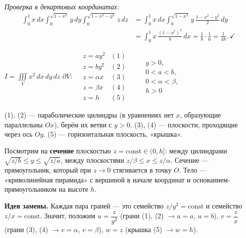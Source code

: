 \emph{Проверка в декартовых координатах:}
\[
\begin{aligned}\int_0^1x\,dx\int_0^{\sqrt{1-x^2}}y\,dy\int_0^{\sqrt{1-x^2-y^2}}z\,dz&=\int_0^1x\,dx\int_0^{\sqrt{1-x^2}}y\,\frac{1-x^2-y^2}{2}\,dy\\
&=\int_0^1x\,\frac{(1-x^2)^2}{8}\,dx=\frac18\cdot\frac16=\frac1{48}.\ \checkmark\end{aligned}
\]


\begin{shapka}
$\displaystyle I=\iiint\limits_{V}x^2\,dx\,dy\,dz$
\tcblower
$\partial V:\quad
\begin{array}{ll}
z=ay^2 & (1)\\
z=by^2 & (2)\\
z=\alpha x & (3)\\
z=\beta x & (4)\\
z=h & (5)
\end{array}\qquad
\begin{array}{l}y>0,\\ 0<a<b,\\ 0<\alpha<\beta,\\ h>0\end{array}$
\end{shapka}

(1), (2) --- параболические цилиндры (в уравнениях нет $x$, образующие параллельны $Ox$), берём их ветви с $y>0$. (3), (4) --- плоскости, проходящие через ось $Oy$. (5) --- горизонтальная плоскость, «крышка».

Посмотрим на \textbf{сечение} плоскостью $z=\mathrm{const}\in(0,h]$:
между цилиндрами $\sqrt{z/b}\leqslant y\leqslant\sqrt{z/a}$, между плоскостями $z/\beta\leqslant x\leqslant z/\alpha$. Сечение --- прямоугольник, который при $z\to0$ стягивается в точку $O$. Тело --- «криволинейная пирамида» с вершиной в начале координат и основанием-прямоугольником на высоте $h$.

\textbf{Идея замены.} Каждая пара граней --- это семейство $z/y^2=\mathrm{const}$ и семейство $z/x=\mathrm{const}$. Значит, положим
$u=\dfrac{z}{y^2}$ (грани (1), (2) $\to u=a$, $u=b$), $v=\dfrac zx$ (грани (3), (4) $\to v=\alpha$, $v=\beta$), $w=z$ (крышка (5) $\to w=h$).

